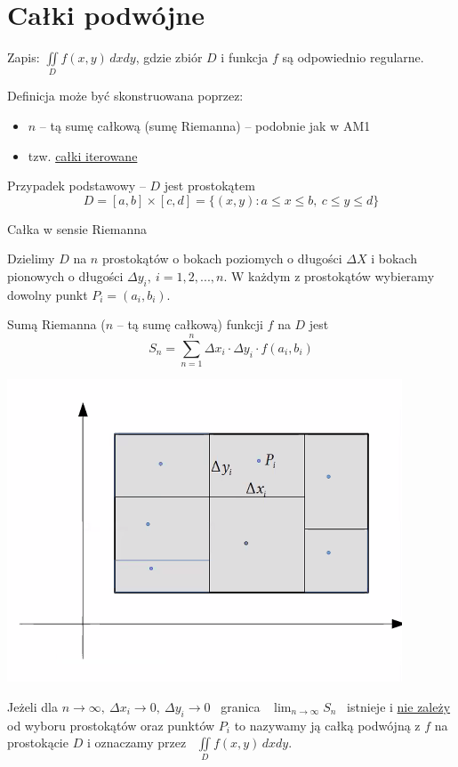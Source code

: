 \section{Całki podwójne}

Zapis: $ \iint\limits_{D} f(x,y)\, dxdy $, gdzie zbiór $D$ i funkcja $f$ są odpowiednio regularne.

Definicja może być skonstruowana poprzez:
\begin{itemize}
    \item $n$ -- tą sumę całkową (sumę Riemanna) -- podobnie jak w AM1
    \item tzw. \underline{całki iterowane}
\end{itemize}
\bigskip

Przypadek podstawowy -- $D$ jest prostokątem
\[ D = [a,b] \times [c,d] = \{ (x,y): a \leq x \leq b, \ c \leq y \leq d \} \]
\medskip

\begin{tw}{Całka w sensie Riemanna}

Dzielimy $D$ na $n$ prostokątów o bokach poziomych o długości $\Delta X$ i bokach pionowych o długości $\Delta y_i, \ i = 1,2,...,n$.
W każdym z prostokątów wybieramy dowolny punkt $P_i = (a_i, b_i)$.

Sumą Riemanna ($n$ -- tą sumę całkową) funkcji $f$ na $D$ jest
\[ S_n = \sum\limits_{n=1}^{n} \Delta x_i \cdot \Delta y_i \cdot f(a_i, b_i) \]
\end{tw}

\begin{center}
    \includegraphics[scale=0.8]{img/prostokat1.png}
\end{center}

Jeżeli dla $ n \to \infty, \ \Delta x_i \to 0, \ \Delta y_i \to 0 $ \ granica \ $ \lim_{n \to \infty} S_n $ \ istnieje i \underline{nie zależy}
od wyboru prostokątów oraz punktów $P_i$ to nazywamy ją całką podwójną z $f$ na prostokącie $D$ i oznaczamy przez \ $ \iint\limits_D f(x,y) \, dxdy $.
\bigskip

